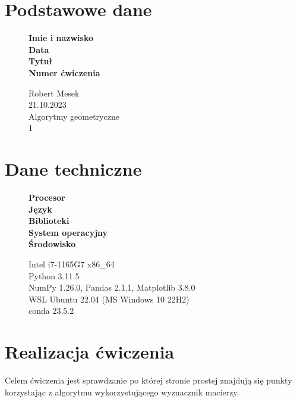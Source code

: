\documentclass[12pt]{article}
\begin{document}
\section*{Podstawowe dane}
\begin{figure}[htp]
	\begin{minipage}[t]{0.3\textwidth}
		\textbf{Imie i nazwisko} \\
		\textbf{Data} \\
		\textbf{Tytuł} \\
		\textbf{Numer ćwiczenia}
	\end{minipage}%
	\begin{minipage}[t]{0.6\textwidth}
		Robert Mesek \\
		21.10.2023 \\
		Algorytmy geometryczne \\
		1
	\end{minipage}%
\end{figure}

\section*{Dane techniczne}
\begin{figure}[htp]
	\begin{minipage}[t]{0.3\textwidth}
		\textbf{Procesor} \\
		\textbf{Język} \\
		\textbf{Biblioteki} \\
		\textbf{System operacyjny} \\
		\textbf{Środowisko}

	\end{minipage}%
	\begin{minipage}[t]{0.6\textwidth}
		Intel i7-1165G7 x86\_64 \\
		Python 3.11.5 \\
		NumPy 1.26.0, Pandas 2.1.1, Matplotlib 3.8.0 \\
		WSL Ubuntu 22.04 (MS Windows 10 22H2) \\
		conda 23.5.2
	\end{minipage}%
\end{figure}

\section*{Realizacja ćwiczenia}
\par
Celem ćwiczenia jest sprawdzanie po której stronie prostej znajdują się punkty korzystając z algorytmu wykorzystującego wyznacznik macierzy.
\end{document}
